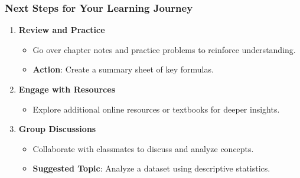 \documentclass[aspectratio=169]{beamer}
\begin{document}
\begin{frame}[fragile]
    \frametitle{Next Steps for Your Learning Journey}

    \begin{enumerate}
        \item \textbf{Review and Practice}
        \begin{itemize}
            \item Go over chapter notes and practice problems to reinforce understanding.
            \item \textbf{Action}: Create a summary sheet of key formulas.
        \end{itemize}

        \item \textbf{Engage with Resources}
        \begin{itemize}
            \item Explore additional online resources or textbooks for deeper insights.
        \end{itemize}

        \item \textbf{Group Discussions}
        \begin{itemize}
            \item Collaborate with classmates to discuss and analyze concepts.
            \item \textbf{Suggested Topic}: Analyze a dataset using descriptive statistics.
        \end{itemize}
    \end{enumerate}
\end{frame}
\end{document}

